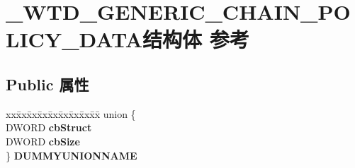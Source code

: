 \hypertarget{struct___w_t_d___g_e_n_e_r_i_c___c_h_a_i_n___p_o_l_i_c_y___d_a_t_a}{}\section{\+\_\+\+W\+T\+D\+\_\+\+G\+E\+N\+E\+R\+I\+C\+\_\+\+C\+H\+A\+I\+N\+\_\+\+P\+O\+L\+I\+C\+Y\+\_\+\+D\+A\+T\+A结构体 参考}
\label{struct___w_t_d___g_e_n_e_r_i_c___c_h_a_i_n___p_o_l_i_c_y___d_a_t_a}
\subsection*{Public 属性}
\begin{DoxyCompactItemize}
\item 
\mbox{\label{struct___w_t_d___g_e_n_e_r_i_c___c_h_a_i_n___p_o_l_i_c_y___d_a_t_a_a163bd20624e226d49cf2dac1c253d90a}} 
\begin{tabbing}
xx\=xx\=xx\=xx\=xx\=xx\=xx\=xx\=xx\=\kill
union \{\\
\>DWORD {\bfseries cbStruct}\\
\>DWORD {\bfseries cbSize}\\
\} {\bfseries DUMMYUNIONNAME}\\


\end{tabbing}
\end{DoxyCompactItemize}

